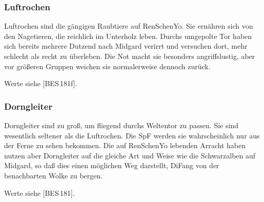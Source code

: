 \documentclass[
a4paper,
twoside,
DIV=calc,
BCOR=4mm,
fontsize=9pt,
twocolumn=on,
titlepage=on,
parskip=half
]{scrartcl}
\begin{document}
\subsubsection{Luftrochen}

Luftrochen sind die gängigen Raubtiere auf RenSchenYo. Sie ernähren
sich von den Nagetieren, die reichlich im Unterholz leben. Durchs
umgepolte Tor haben sich bereits mehrere Dutzend nach Midgard verirrt
und versuchen dort, mehr schlecht als recht zu überleben. Die Not
macht sie besonders angriffslustig, aber vor größeren Gruppen weichen
sie normalerweise dennoch zurück.

Werte siehe [BES\,181f].

\subsubsection{Dorngleiter}

Dorngleiter sind zu groß, um fliegend durchs Weltentor zu passen. Sie
sind wesentlich seltener als die Luftrochen. Die SpF werden sie
wahrscheinlich nur aus der Ferne zu sehen bekommen. Die auf RenSchenYo
lebenden Arracht haben nutzen aber Dorngleiter auf die gleiche Art und
Weise wie die Schwarzalben auf Midgard, so daß dies einen möglichen
Weg darstellt, DiFang von der benachbarten Wolke zu bergen.

Werte siehe [BES\,181].
\end{document}
